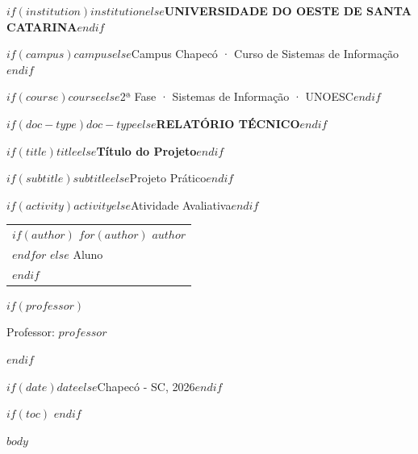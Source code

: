 \documentclass[12pt,a4paper]{article}
\begin{document}
\begin{titlepage}
  \centering
  {\large\bfseries\color{unoescazul} $if(institution)$$institution$$else$UNIVERSIDADE DO OESTE DE SANTA CATARINA$endif$\par}
  {\normalsize $if(campus)$$campus$$else$Campus Chapecó · Curso de Sistemas de Informação$endif$\par}
  {\normalsize $if(course)$$course$$else$2ª Fase · Sistemas de Informação · UNOESC$endif$\par}
  \vspace{3cm}

  {\Large\bfseries\color{unoescazul} $if(doc-type)$$doc-type$$else$RELATÓRIO TÉCNICO$endif$\par}
  \vspace{0.6cm}
  {\LARGE\bfseries $if(title)$$title$$else$Título do Projeto$endif$\par}
  \vspace{0.4cm}
  {\large $if(subtitle)$$subtitle$$else$Projeto Prático$endif$\par}
  \vspace{0.3cm}
  {\normalsize $if(activity)$$activity$$else$Atividade Avaliativa$endif$\par}
  \vspace{3cm}

  \begin{tabular}{l}
  $if(author)$
    $for(author)$
      $author$ \\
    $endfor$
  $else$
    Aluno \\
  $endif$
  \end{tabular}
  \vspace{2cm}

  $if(professor)$
  {\normalsize Professor: $professor$\par}
  $endif$
  \vfill
  {\normalsize $if(date)$$date$$else$Chapecó - SC, 2026$endif$\par}
\end{titlepage}

$if(toc)$
\tableofcontents
\newpage
$endif$

$body$
\end{document}
